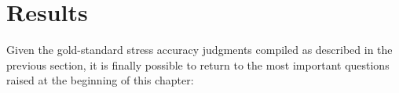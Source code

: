 %				
%				
%				
%				
%					
%					
%					
%					
		


	\section{Results}
	\label{sec:lexstress:results}		
			
		
		Given the gold-standard stress accuracy judgments compiled as described in the previous section, it is finally possible to return to the most important questions raised at the beginning of this chapter:
		
